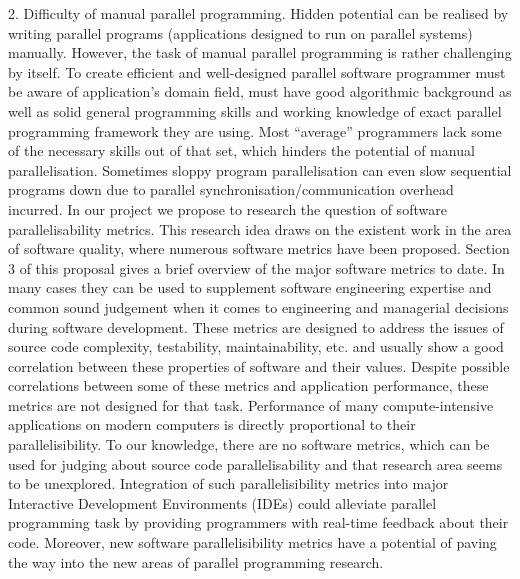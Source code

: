 2. Difficulty of manual parallel programming. Hidden potential can be realised by writing parallel programs (applications designed to run on parallel systems) manually. However, the task of manual parallel programming is rather challenging by itself. To create efficient and well-designed parallel software programmer must be aware of application's domain field, must have
good algorithmic background as well as solid general programming skills and
working knowledge of exact parallel programming framework they are using. Most
“average” programmers lack some of the necessary skills out of that set, which
hinders the potential of manual parallelisation. Sometimes sloppy program
parallelisation can even slow sequential programs down due to parallel
synchronisation/communication overhead incurred. In our project we propose to research the question of software parallelisability metrics. This research idea draws on the existent work in the area of software quality, where numerous software metrics have been proposed. Section 3 of this proposal gives a brief overview of the major software metrics to date. In many cases they can be used to supplement software engineering expertise and common sound judgement when it comes to engineering and managerial decisions during software development. These metrics are designed to address the issues of source code complexity, testability, maintainability, etc. and usually show a good correlation between these properties of software and their values. Despite possible correlations between some of these metrics and application performance, these metrics are not designed for that task. Performance of many compute-intensive applications on modern computers is directly proportional to their parallelisibility. To our knowledge, there are no software metrics, which can be used for judging about source code parallelisability and that research area seems to be unexplored.
Integration of such parallelisibility metrics into major Interactive Development
Environments (IDEs) could alleviate parallel programming task by providing programmers with real-time feedback about their code. Moreover, new software
parallelisibility metrics have a potential of paving the way into the new areas of parallel programming research.